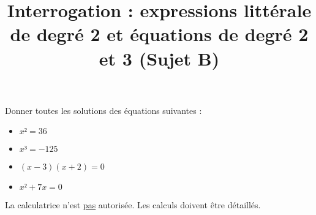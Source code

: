 \documentclass[
	classe=$1^{ere}STI2D$,
	headerTitle=Interrogation
]{évaluation}
\begin{document}
\begin{exercice}
	Donner toutes les solutions des équations suivantes :
	\begin{multicols}{2}
		\begin{itemize}
			\item $x² = 36$\vspace{\spacing}

			\item $x³ = -125$\vspace{\spacing}

			\item $(x - 3)(x + 2) = 0$\vspace{\spacing}

			\item $x² + 7x = 0$\vspace{\spacing}

		\end{itemize}
	\end{multicols}
\end{exercice}

\newpage
\setcounter{exercice}{1}

\title{Interrogation : expressions littérale de degré 2 et équations de degré 2 et 3 (Sujet B)}

\maketitle

\begin{tcolorbox}
	La calculatrice n'est \uline{pas} autorisée. Les calculs doivent être détaillés.
\end{tcolorbox}
\end{document}
